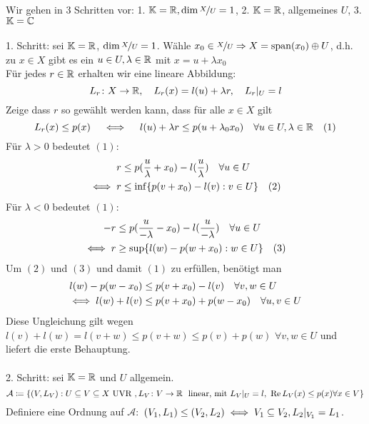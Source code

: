 \begin{beweis}
	Wir gehen in 3 Schritten vor: 1. $\mathbb{K} = \mathbb{R}, \dim \nicefrac{X}{U} = 1$, 2. $ \mathbb{K} = \mathbb{R}$, allgemeines $U$, 3. $\mathbb{K} = \mathbb{C}$ \\ \\
	1. Schritt: sei $\mathbb{K} = \mathbb{R}$, $\dim \nicefrac{X}{U} = 1$. Wähle $x_{0} \in \nicefrac{X}{U} \Rightarrow X = \operatorname{span}(x_{0}) \oplus U$, d.h. zu $x \in X$ gibt es ein $u \in U, \lambda \in \mathbb{R}$ mit $x = u + \lambda x_{0}$ \\
	Für jedes $r \in \mathbb{R}$ erhalten wir eine lineare Abbildung:
	\[ L_{r} \colon X \rightarrow \mathbb{R}, \quad L_{r} (x) = l(u) + \lambda r, \quad L_{r}|_{U} = l \]
	Zeige dass $r$ so gewählt werden kann, dass für alle $x \in X$ gilt
	\[  L_{r}(x) \leq p(x) \quad \iff \quad l(u) + \lambda r \leq p(u + \lambda_{0} x_{0}) \quad \forall u \in U, \lambda \in \mathbb{R} \quad (1) \label{eq:20.2.5-1} \]
	Für $\lambda > 0$ bedeutet \hyperref[eq:20.2.5-1]{$(1)$}:
	\begin{align*}
		r & \leq p(\frac{u}{\lambda} + x_{0}) - l(\frac{u}{\lambda}) \quad \forall u \in U \\
		\iff r & \leq \inf \{ p( v + x_{0}) - l(v) : v \in U \} \quad (2) \label{eq:20.2.5-2}
	\end{align*}
	Für $\lambda < 0$ bedeutet \hyperref[eq:20.2.5-1]{$(1)$}:
	\begin{align*}
		- r & \leq p(\frac{u}{- \lambda} - x_{0}) - l(\frac{u}{- \lambda}) \quad \forall u \in U \\
		\iff r & \geq \sup \{ l(w) - p( w + x_{0}) : w \in U \} \quad (3) \label{eq:20.2.5-3}
	\end{align*}
	Um \hyperref[eq:20.2.5-2]{$(2)$} und \hyperref[eq:20.2.5-3]{$(3)$} und damit \hyperref[eq:20.2.5-1]{$(1)$} zu erfüllen, benötigt man
	\begin{align*}
		l(w) - p(w - x_{0}) & \leq p(v + x_{0}) - l(v) \quad \forall v, w \in U \\
		\iff l(w) + l(v) & \leq p(v + x_{0}) + p(w - x_{0}) \quad \forall u, v \in U
	\end{align*}
	Diese Ungleichung gilt wegen $l(v) + l(w) = l(v + w) \leq p(v + w) \leq p(v) + p(w)$ $\forall v, w \in U$ und liefert die erste Behauptung. \\ \\
	2. Schritt: sei $\mathbb{K} = \mathbb{R}$ und $U$ allgemein. 
		\[ \mathcal{A} \coloneqq \{ (V, L_{V}) : U \subseteq V \subseteq X \text{ UVR }, L_{V} \colon V \rightarrow \MdR \text{ linear, mit } L_{V}|_{U} = l, ~ \Re L_{V}(x) \leq p(x) \forall x \in V \} \]
	Definiere eine Ordnung auf $\mathcal{A}:$ $(V_{1}, L_{1}) \leq (V_{2}, L_{2}) \iff V_{1} \subseteq V_{2}, L_{2}|_{V_{1}} = L_{1}$. \\

\end{beweis}
